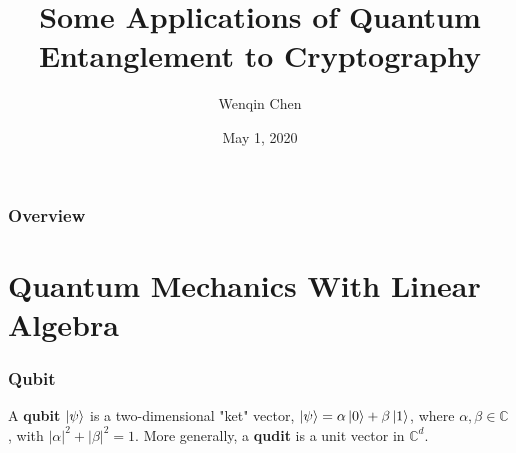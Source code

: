 \documentclass[handout, 10 pt]{beamer}
\title{Some Applications of Quantum Entanglement to Cryptography} %
\author{Wenqin Chen} %
\institute[Smith College] %
{\normalsize{Smith College}\\ %
\smallskip
Thesis Advisors: Dr. David Meyer, Prof. Rajan Mehta
}
\date{May 1, 2020} %
\begin{document}
\begin{frame}
\titlepage %
\end{frame}

\begin{frame}
\frametitle{Overview} %
\tableofcontents %
\end{frame}





\section{Quantum Mechanics With Linear Algebra}



\begin{frame}
\frametitle{Qubit}



\smallskip
A \textbf{qubit} $\ket{\psi}$ is a two-dimensional "ket" vector, $\ket{\psi}=\alpha\ket{0}+\beta\ket{1}$, 
where $\alpha,\beta\in\mathbb{C}$, with $|\alpha|^2+|\beta|^2=1$.
More generally, a \textbf{qudit} is a unit vector in ${\mathbb{C}}^d$.
\end{frame}
\end{document}
